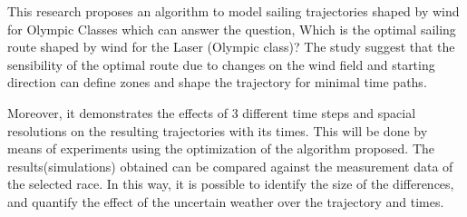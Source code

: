This research proposes an algorithm to model sailing trajectories shaped by wind for Olympic Classes which %
can answer the question, Which is the optimal sailing route shaped by wind for the Laser (Olympic class)?  The study suggest that the sensibility of the optimal route due to changes on the wind field and starting direction can define zones and shape the trajectory for minimal time paths. \par 

Moreover, it demonstrates the effects of 3 different time steps and spacial resolutions on the resulting trajectories with its times. This will be done by means of experiments using the optimization of the algorithm proposed. The results(simulations) obtained can be compared against the measurement data of the selected race. In this way, it is possible to identify the size of the differences, and quantify the effect of the uncertain weather over the trajectory and times.\par 

